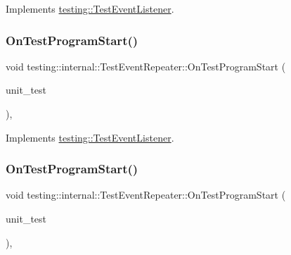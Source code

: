 Implements \mbox{\hyperlink{classtesting_1_1_test_event_listener_a5f6c84f39851e8a603a2d2e10063816b}{testing\+::\+Test\+Event\+Listener}}.

\mbox{\label{classtesting_1_1internal_1_1_test_event_repeater_abe19a6eed2548e9c768ae2d156f1f593}} 
\subsubsection{\texorpdfstring{OnTestProgramStart()}{OnTestProgramStart()}\hspace{0.1cm}{\footnotesize\ttfamily [2/3]}}
{\footnotesize\ttfamily void testing\+::internal\+::\+Test\+Event\+Repeater\+::\+On\+Test\+Program\+Start (\begin{DoxyParamCaption}\item[{const \mbox{\hyperlink{classtesting_1_1_unit_test}{Unit\+Test}} \&}]{unit\+\_\+test }\end{DoxyParamCaption})\hspace{0.3cm}{\ttfamily [override]}, {\ttfamily [virtual]}}



Implements \mbox{\hyperlink{classtesting_1_1_test_event_listener_a5f6c84f39851e8a603a2d2e10063816b}{testing\+::\+Test\+Event\+Listener}}.

\mbox{\label{classtesting_1_1internal_1_1_test_event_repeater_abe19a6eed2548e9c768ae2d156f1f593}} 
\subsubsection{\texorpdfstring{OnTestProgramStart()}{OnTestProgramStart()}\hspace{0.1cm}{\footnotesize\ttfamily [3/3]}}
{\footnotesize\ttfamily void testing\+::internal\+::\+Test\+Event\+Repeater\+::\+On\+Test\+Program\+Start (\begin{DoxyParamCaption}\item[{const \mbox{\hyperlink{classtesting_1_1_unit_test}{Unit\+Test}} \&}]{unit\+\_\+test }\end{DoxyParamCaption})\hspace{0.3cm}{\ttfamily [override]}, {\ttfamily [virtual]}}




